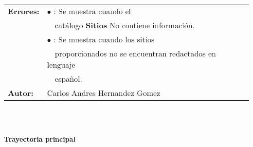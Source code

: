 \begin{tabular}{|l|l|}
	\textbf{Errores:} & $\bullet$ \Tref{MSG1}{MSG1 Catálago vacio}: Se muestra cuando el\\
	&\ \ catálogo \textbf{Sitios} No contiene información. \\
	&$\bullet$ \Tref{MSG2}{MSG2 Lenguaje de sitio}: Se muestra cuando los sitios \\
	&\ \ proporcionados no se encuentran redactados en lenguaje\\
	&\ \ español.\\
	\hline

	\textbf{Autor:} & Carlos Andres Hernandez Gomez \\
	\hline
\end{tabular}\\\\



\begin{large}
	\textbf{Trayectoria principal}\\
\end{large}	

